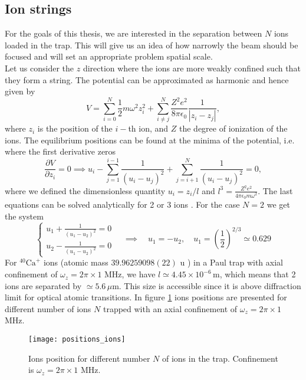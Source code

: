 \subsection{Ion strings}
\label{ionstrings}
For the goals of this thesis, we are interested in the separation between $N$ ions loaded in the trap. This will give us an idea of how narrowly the beam should be focused and will set an appropriate problem spatial scale.\\
Let us consider the $z$ direction where the ions are more weakly confined such that they form a string. The potential can be approximated as harmonic and hence given by
\begin{equation}
V = \sum_{i=0}^N \frac{1}{2}m\omega^2z_i^2 + \sum_{i\neq j}^N\frac{Z^2e^2}{8\pi \epsilon_0}\frac{1}{|z_i-z_j|},
\end{equation}
where $z_i$ is the position of the $i-$th ion, and $Z$ the degree of ionization of the ions. The equilibrium positions can be found at the minima of the potential, i.e. where the first derivative zeros
\begin{equation}
\frac{\partial V}{\partial z_i} = 0 \implies u_i - \sum_{j=1}^{i-1} \frac{1}{(u_i-u_j)^2} + \sum_{j= i+1}^{N} \frac{1}{(u_i-u_j)^2}= 0,
\end{equation}
where we defined the dimensionless quantity $u_i = z_i/l$ and $l^3 = \displaystyle\frac{Z^2 e^2 }{4\pi \epsilon_0 m\omega^2}$.
The last equations can be solved analytically for 2 or 3 ions \cite{ion_spacing}. For the case $N=2$ we get the system
\begin{equation}
\begin{cases}
  u_1 + \frac{1}{(u_1-u_2)^2} = 0\\
  u_2 - \frac{1}{(u_1-u_2)^2} = 0
  \end{cases} \quad \implies \quad u_1 = -u_2,\quad  u_1 = \left(\frac{1}{2}\right)^{2/3} \simeq 0.629
\end{equation}
For $^{40}\text{Ca}^+$ ions (atomic mass $39.96259098(22)$ u \cite{AUDI2003337}) in a Paul trap with axial confinement of $\omega_z = 2\pi \times 1$ MHz, we have $l \simeq 4.45\times 10^{-6}\,$m, which means that 2 ions are separated by $\simeq 5.6\, \mu$m. This size is accessible since it is above diffraction limit for optical atomic transitions.
In figure \ref{positions_ions} ions positions are presented for different number of ions $N$ trapped with an axial confinement of $\omega_z = 2\pi \times 1$ MHz.

\begin{figure}[H]
\hspace{-5em}\texttt{[image: positions\_ions]}
\caption{Ions position for different number $N$ of ions in the trap. Confinement is $\omega_z = 2\pi\times 1$ MHz.}
\label{positions_ions}
\end{figure}



